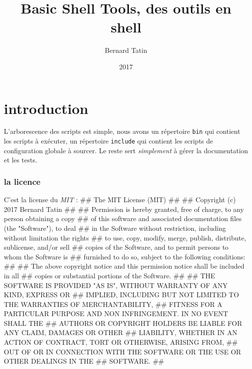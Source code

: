 \documentclass{scrartcl}%
\author{Bernard Tatin}
\date{2017}
\title{Basic Shell Tools, des outils en shell}
\begin{document}
\maketitle
{}

\tableofcontents
\part{introduction}

L'arborescence des scripts est simple, nous avons un répertoire \texttt{bin} qui contient les scripts à exécuter, un répertoire \texttt{include} qui contient les scripts de configuration globale à sourcer. Le reste sert \emph{simplement} à gérer la documentation et les tests.

\section{la licence}
C'est la license du \emph{MIT} :
\endmoddef\nwstartdeflinemarkup{}\nwenddeflinemarkup
## The MIT License (MIT)
##
## Copyright (c) 2017 Bernard Tatin
##
## Permission is hereby granted, free of charge, to any person obtaining a copy
## of this software and associated documentation files (the "Software"), to deal
## in the Software without restriction, including without limitation the rights
## to use, copy, modify, merge, publish, distribute, sublicense, and/or sell
## copies of the Software, and to permit persons to whom the Software is
## furnished to do so, subject to the following conditions:
##
## The above copyright notice and this permission notice shall be included in all
## copies or substantial portions of the Software.
##
## THE SOFTWARE IS PROVIDED "AS IS", WITHOUT WARRANTY OF ANY KIND, EXPRESS OR
## IMPLIED, INCLUDING BUT NOT LIMITED TO THE WARRANTIES OF MERCHANTABILITY,
## FITNESS FOR A PARTICULAR PURPOSE AND NON INFRINGEMENT. IN NO EVENT SHALL THE
## AUTHORS OR COPYRIGHT HOLDERS BE LIABLE FOR ANY CLAIM, DAMAGES OR OTHER
## LIABILITY, WHETHER IN AN ACTION OF CONTRACT, TORT OR OTHERWISE, ARISING FROM,
## OUT OF OR IN CONNECTION WITH THE SOFTWARE OR THE USE OR OTHER DEALINGS IN THE
## SOFTWARE.
##
\nwendcode{}\nwdocspar
\end{document}
